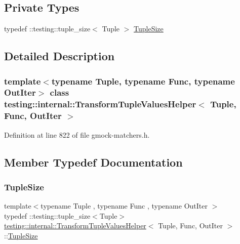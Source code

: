 \subsection*{Private Types}
\begin{DoxyCompactItemize}
\item 
typedef \+::testing\+::tuple\+\_\+size$<$ Tuple $>$ \hyperlink{classtesting_1_1internal_1_1TransformTupleValuesHelper_a4bbd4985cbe384041cb5b94c2a7d2d63}{Tuple\+Size}
\end{DoxyCompactItemize}


\subsection{Detailed Description}
\subsubsection*{template$<$typename Tuple, typename Func, typename Out\+Iter$>$\newline
class testing\+::internal\+::\+Transform\+Tuple\+Values\+Helper$<$ Tuple, Func, Out\+Iter $>$}



Definition at line 822 of file gmock-\/matchers.\+h.



\subsection{Member Typedef Documentation}
\mbox{\label{classtesting_1_1internal_1_1TransformTupleValuesHelper_a4bbd4985cbe384041cb5b94c2a7d2d63}} 
\subsubsection{\texorpdfstring{Tuple\+Size}{TupleSize}}
{\footnotesize\ttfamily template$<$typename Tuple , typename Func , typename Out\+Iter $>$ \\
typedef \+::testing\+::tuple\+\_\+size$<$Tuple$>$ \hyperlink{classtesting_1_1internal_1_1TransformTupleValuesHelper}{testing\+::internal\+::\+Transform\+Tuple\+Values\+Helper}$<$ Tuple, Func, Out\+Iter $>$\+::\hyperlink{classtesting_1_1internal_1_1TransformTupleValuesHelper_a4bbd4985cbe384041cb5b94c2a7d2d63}{Tuple\+Size}\hspace{0.3cm}{\ttfamily [private]}}



